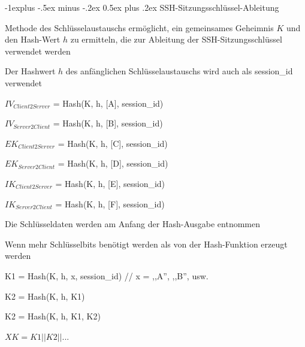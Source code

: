 \documentclass[a4paper]{article}
\makeatletter
\renewcommand{\subsection}{\@startsection{subsection}{2}{0mm}%
 {-1explus -.5ex minus -.2ex}%
 {0.5ex plus .2ex}%
 {\normalfont\normalsize\bfseries}}
\makeatother
\begin{document}
\begin{multicols}{3}
      \subsection{SSH-Sitzungsschlüssel-Ableitung}
      \begin{itemize*}
            \item Methode des Schlüsselaustauschs ermöglicht, ein gemeinsames Geheimnis $K$ und den Hash-Wert $h$ zu ermitteln, die zur Ableitung der SSH-Sitzungsschlüssel verwendet werden
            \item Der Hashwert $h$ des anfänglichen Schlüsselaustauschs wird auch als session\_id verwendet
            \item $IV_{Client2Server}$ = Hash(K, h, [A], session\_id) %
            \item $IV_{Server2Client}$ = Hash(K, h, [B], session\_id) %
            \item $EK_{Client2Server}$ = Hash(K, h, [C], session\_id) %
            \item $EK_{Server2Client}$ = Hash(K, h, [D], session\_id) %
            \item $IK_{Client2Server}$ = Hash(K, h, [E], session\_id) %
            \item $IK_{Server2Client}$ = Hash(K, h, [F], session\_id) %
            \item Die Schlüsseldaten werden am Anfang der Hash-Ausgabe entnommen
            \item Wenn mehr Schlüsselbits benötigt werden als von der Hash-Funktion erzeugt werden
            \begin{itemize*}
                  \item K1 = Hash(K, h, x, session\_id) // x = ,,A'', ,,B'', usw.
                  \item K2 = Hash(K, h, K1)
                  \item K2 = Hash(K, h, K1, K2)
                  \item $XK = K1 || K2 || ...$
            \end{itemize*}
      \end{itemize*}


\end{multicols}
\end{document}
